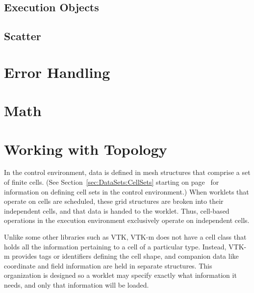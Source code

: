 
\subsection{Execution Objects}
\label{sec:ExecutionObjects}



\subsection{Scatter}
\label{sec:WorkletScatter}





\section{Error Handling}
\label{sec:ExecutionEnvironment:ErrorHandling}

\section{Math}


\section{Working with Topology}

In the control environment, data is defined in mesh structures that
comprise a set of finite cells. (See Section~\ref{sec:DataSets:CellSets}
starting on page~\pageref{sec:DataSets:CellSets} for information on
defining cell sets in the control environment.) When worklets that operate
on cells are scheduled, these grid structures are broken into their
independent cells, and that data is handed to the worklet. Thus, cell-based
operations in the execution environment exclusively operate on independent
cells.

Unlike some other libraries such as VTK, VTK-m does not have a cell class
that holds all the information pertaining to a cell of a particular type.
Instead, VTK-m provides tags or identifiers defining the cell shape, and
companion data like coordinate and field information are held in separate
structures. This organization is designed so a worklet may specify exactly
what information it needs, and only that information will be loaded.

